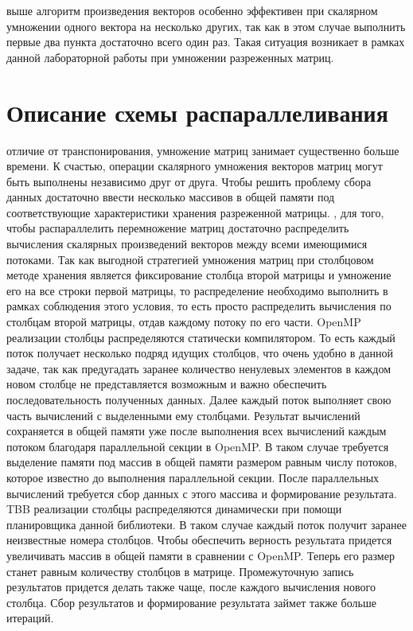 \documentclass[12pt]{report}
\begin{document}
 выше алгоритм произведения векторов особенно эффективен при скалярном умножении одного вектора на несколько других, так как в этом случае выполнить первые два пункта достаточно всего один раз. Такая ситуация возникает в рамках данной лабораторной работы при умножении разреженных матриц.

\newpage

\section*{Описание схемы распараллеливания}
 отличие от транспонирования, умножение матриц занимает существенно больше времени. К счастью, операции скалярного умножения векторов матриц могут быть выполнены независимо друг от друга. Чтобы решить проблему сбора данных достаточно ввести несколько массивов в общей памяти под соответствующие характеристики хранения разреженной матрицы.
, для того, чтобы распараллелить перемножение матриц достаточно распределить вычисления скалярных произведений векторов между всеми имеющимися потоками. Так как выгодной стратегией умножения матриц при столбцовом методе хранения является фиксирование столбца второй матрицы и умножение его на все строки первой матрицы, то распределение необходимо выполнить в рамках соблюдения этого условия, то есть просто распределить вычисления по столбцам второй матрицы, отдав каждому потоку по его части.
 OpenMP реализации столбцы распределяются статически компилятором. То есть каждый поток получает несколько подряд идущих столбцов, что очень удобно в данной задаче, так как предугадать заранее количество ненулевых элементов в каждом новом столбце не представляется возможным и важно обеспечить последовательность полученных данных. Далее каждый поток выполняет свою часть вычислений с выделенными ему столбцами. Результат вычислений сохраняется в общей памяти уже после выполнения всех вычислений каждым потоком благодаря параллельной секции в OpenMP. В таком случае требуется выделение памяти под массив в общей памяти размером равным числу потоков, которое известно до выполнения параллельной секции. После параллельных вычислений требуется сбор данных с этого массива и формирование результата.
 TBB реализации столбцы распределяются динамически при помощи планировщика данной библиотеки. В таком случае каждый поток получит заранее неизвестные номера столбцов. Чтобы обеспечить верность результата придется увеличивать массив в общей памяти в сравнении с OpenMP. Теперь его размер станет равным количеству столбцов в матрице. Промежуточную запись результатов придется делать также чаще, после каждого вычисления нового столбца. Сбор результатов и формирование результата займет также больше итераций.
\end{document}
